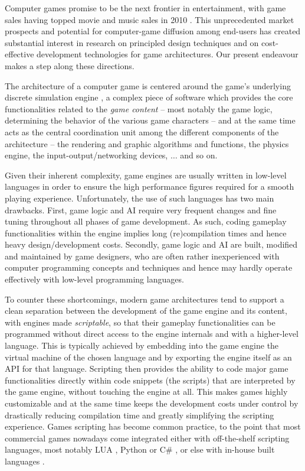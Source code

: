 
Computer games promise to be the next frontier in entertainment, with
game sales having topped movie and music sales in 2010 \cite{ESA}. 
This unprecedented market prospects and potential for computer-game 
diffusion among end-users has created substantial interest 
in research on principled design techniques and on 
cost-effective development technologies for game architectures. 
Our present endeavour makes a step along these directions. 

The architecture of a computer game is centered around the game's
underlying discrete simulation engine  \cite{DESIGN_PC_GAME_ENGINE}, 
a complex piece of software which provides the core functionalities
related to the {\em game content} -- most notably the game logic,
determining the behavior of the various game characters -- 
and at the same time acts as the central coordination unit among the
different components of the architecture -- the rendering and graphic
algorithms and  functions, the physics engine, the
input-output/networking devices, $\dots$ and so on. 

Given their inherent complexity, game engines are usually written in
low-level languages in order to ensure the high performance figures
required for a smooth playing experience. Unfortunately, the use of
such languages has two main drawbacks. First, game logic and
AI require very frequent changes and fine tuning throughout all
phases of game development. As such, coding gameplay functionalities
within the engine  implies long (re)compilation times and hence heavy
design/development costs. Secondly, game logic and AI  
are built, modified and maintained by game designers,  who are often
rather inexperienced with computer programming concepts and
techniques and hence may hardly operate effectively with low-level
programming languages. 

To counter these shortcomings, modern game architectures tend
to support a clean separation between the development of the game
engine and its content, with engines made \textit{scriptable}, so that
their gameplay functionalities can be programmed without direct access
to the engine internals and with a higher-level language. This is
typically achieved by embedding into the game engine the virtual
machine of the chosen language and by exporting the engine
itself as an API for that language. Scripting then provides the
ability to code major game functionalities directly within code
snippets (the  scripts) that are interpreted by the game engine,
without touching  the engine at all. This makes games highly
customizable and at the  
same time keeps the development costs under control by drastically
reducing compilation time and greatly simplifying the scripting experience. 
Games scripting has become common practice, to the point that most 
commercial games nowadays come integrated either with off-the-shelf scripting 
languages, most notably LUA \cite{SCRIPTING_LUA}, Python \cite{SCRIPTING_PYTHON} or
C\# \cite{UNITY_YIELD}, or else with  in-house built
languages \cite{UNREALSCRIPT_LATENT_FUNCTIONS}.   

